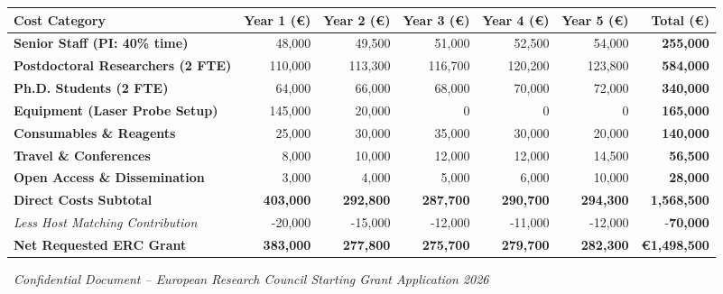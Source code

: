 \documentclass[11pt,a4paper]{article}
\begin{document}
\vspace{6pt}
\small
\begin{tabularx}{\textwidth}{@{}X r r r r r r@{}}
  \toprule
  \textbf{Cost Category} & \textbf{Year 1 (\euro)} & \textbf{Year 2 (\euro)} & \textbf{Year 3 (\euro)} & \textbf{Year 4 (\euro)} & \textbf{Year 5 (\euro)} & \textbf{Total (\euro)} \\
  \midrule
  \textbf{Senior Staff (PI: 40\% time)} & 48,000 & 49,500 & 51,000 & 52,500 & 54,000 & \textbf{255,000} \\
  \textbf{Postdoctoral Researchers (2 FTE)} & 110,000 & 113,300 & 116,700 & 120,200 & 123,800 & \textbf{584,000} \\
  \textbf{Ph.D. Students (2 FTE)} & 64,000 & 66,000 & 68,000 & 70,000 & 72,000 & \textbf{340,000} \\
  \textbf{Equipment (Laser Probe Setup)} & 145,000 & 20,000 & 0 & 0 & 0 & \textbf{165,000} \\
  \textbf{Consumables \& Reagents} & 25,000 & 30,000 & 35,000 & 30,000 & 20,000 & \textbf{140,000} \\
  \textbf{Travel \& Conferences} & 8,000 & 10,000 & 12,000 & 12,000 & 14,500 & \textbf{56,500} \\
  \textbf{Open Access \& Dissemination} & 3,000 & 4,000 & 5,000 & 6,000 & 10,000 & \textbf{28,000} \\
  \midrule
  \textbf{Direct Costs Subtotal} & \textbf{403,000} & \textbf{292,800} & \textbf{287,700} & \textbf{290,700} & \textbf{294,300} & \textbf{1,568,500} \\
  \textit{Less Host Matching Contribution} & -20,000 & -15,000 & -12,000 & -11,000 & -12,000 & -\textbf{70,000} \\
  \midrule
  \textbf{Net Requested ERC Grant} & \textbf{383,000} & \textbf{277,800} & \textbf{275,700} & \textbf{279,700} & \textbf{282,300} & \textbf{\euro 1,498,500} \\
  \bottomrule
\end{tabularx}
\normalsize

\vspace{12pt}
\begin{center}
  \small \color{ErcGray}
  \faLock\ \textit{Confidential Document -- European Research Council Starting Grant Application 2026}
\end{center}
\end{document}
